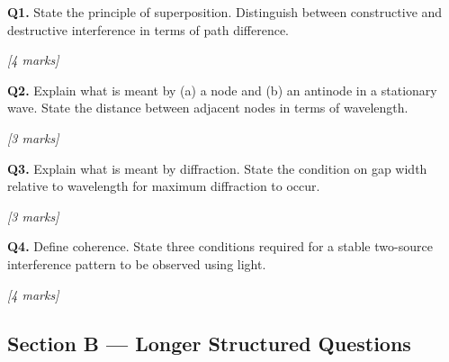 \begin{tcolorbox}[colback=white, colframe=midblue, breakable]

\begin{minipage}{\linewidth}
\textbf{Q1.} State the principle of superposition. Distinguish between constructive and destructive interference in terms of path difference.
\par\hfill\textit{[4 marks]}
\vspace{4cm}
\end{minipage}

\begin{minipage}{\linewidth}
\textbf{Q2.} Explain what is meant by (a) a node and (b) an antinode in a stationary wave. State the distance between adjacent nodes in terms of wavelength.
\par\hfill\textit{[3 marks]}
\vspace{3.5cm}
\end{minipage}

\begin{minipage}{\linewidth}
\textbf{Q3.} Explain what is meant by diffraction. State the condition on gap width relative to wavelength for maximum diffraction to occur.
\par\hfill\textit{[3 marks]}
\vspace{3.5cm}
\end{minipage}

\begin{minipage}{\linewidth}
\textbf{Q4.} Define coherence. State three conditions required for a stable two-source interference pattern to be observed using light.
\par\hfill\textit{[4 marks]}
\vspace{4cm}
\end{minipage}

\end{tcolorbox}

\subsection*{Section B --- Longer Structured Questions}

